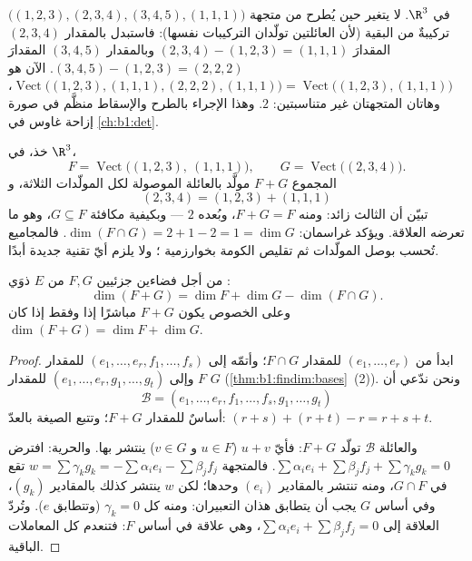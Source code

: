 \begin{example}
\label{ex:b1:findim:rankcomputation}
 $\bigl((1,2,3), (2,3,4), (3,4,5), (1,1,1)\bigr)$ في
$\R^3$. لا يتغير  حين يُطرح من متجهة
تركيبةٌ من البقية (لأن العائلتين تولّدان التركيبات
نفسها): فاستبدل بالمقدار $(2,3,4)$ المقدارَ $(2,3,4) - (1,2,3) = (1,1,1)$
وبالمقدار $(3,4,5)$ المقدارَ $(3,4,5) - (1,2,3) = (2,2,2)$.  الآن هو
$\operatorname{Vect}\bigl((1,2,3), (1,1,1), (2,2,2),
(1,1,1)\bigr) = \operatorname{Vect}\bigl((1,2,3), (1,1,1)\bigr)$،
وهاتان المتجهتان غير متناسبتين:  $2$. وهذا
الإجراء بالطرح والإسقاط منظَّم في صورة إزاحة غاوس
في \cref{ch:b1:det}.
\end{example}

\begin{example}
\label{ex:b1:findim:sumconcat}
خذ، في $\R^3$،
\[
F = \operatorname{Vect}\bigl((1,2,3),\ (1,1,1)\bigr),
\qquad
G = \operatorname{Vect}\bigl((2,3,4)\bigr) .
\]
المجموع $F + G$ مولَّد بالعائلة الموصولة لكل
المولّدات الثلاثة، و
\[
(2, 3, 4) = (1, 2, 3) + (1, 1, 1)
\]
تبيّن أن الثالث زائد: ومنه $F + G = F$، وبُعده $2$ ---
وبكيفية مكافئة $G \subseteq F$، وهو ما تعرضه العلاقة.
ويؤكد غراسمان: $\dim(F \cap G) = 2 + 1 - 2 = 1 = \dim G$.
فالمجاميع تُحسب بوصل المولّدات ثم تقليص
الكومة بخوارزمية ؛ ولا يلزم أيّ تقنية جديدة أبدًا.
\end{example}

\begin{theorem}\label{thm:b1:findim:grassmann}
من أجل فضاءين جزئيين $F, G$ من $E$ ذوَي :
\[
\dim(F + G) = \dim F + \dim G - \dim(F \cap G) .
\]
وعلى الخصوص يكون $F + G$ مباشرًا إذا وفقط إذا كان $\dim(F + G) = \dim F + \dim G$.
\end{theorem}

\begin{proof}
ابدأ من  $(e_1, \dots, e_r)$ للمقدار $F \cap G$؛ وأتمّه
إلى  $(e_1, \dots, e_r, f_1, \dots, f_s)$ للمقدار $F$ وإلى
 $(e_1, \dots, e_r, g_1, \dots, g_t)$ للمقدار $G$
(\cref{thm:b1:findim:bases}~(2)). ونحن ندّعي أن
\[
\mathcal{B} = (e_1, \dots, e_r, f_1, \dots, f_s, g_1, \dots, g_t)
\]
أساسٌ للمقدار $F + G$؛ وتتبع الصيغة بالعدّ: $(r + s) +
(r + t) - r = r + s + t$.

والعائلة $\mathcal{B}$ تولّد $F + G$: فأيّ $u + v$ ($u \in F$ و $v \in G$)
ينتشر بها. والحرية: افترض $\sum \alpha_i e_i + \sum
\beta_j f_j + \sum \gamma_k g_k = 0$. فالمتجهة $w = \sum \gamma_k
g_k = -\sum\alpha_i e_i - \sum\beta_j f_j$ تقع في $G \cap F$، ومنه
تنتشر بالمقادير $(e_i)$ وحدها؛ لكن $w$ ينتشر كذلك بالمقادير $(g_k)$، وفي
أساس $G$ يجب أن يتطابق هذان التعبيران: ومنه كل
$\gamma_k = 0$ (وتتطابق  $e$). وتُردّ العلاقة
إلى $\sum\alpha_i e_i + \sum\beta_j f_j = 0$، وهي علاقة في أساس
$F$: فتنعدم كل المعاملات الباقية.
\end{proof}

